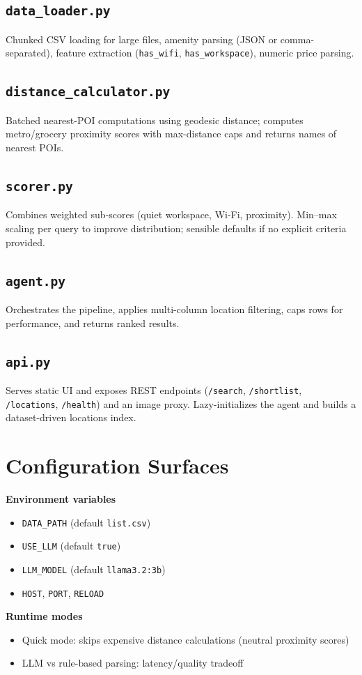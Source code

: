 \documentclass[11pt]{article}
\begin{document}
\subsection{\texttt{data\_loader.py}}
Chunked CSV loading for large files, amenity parsing (JSON or comma-separated), feature extraction (\texttt{has\_wifi}, \texttt{has\_workspace}), numeric price parsing.

\subsection{\texttt{distance\_calculator.py}}
Batched nearest-POI computations using geodesic distance; computes metro/grocery proximity scores with max-distance caps and returns names of nearest POIs.

\subsection{\texttt{scorer.py}}
Combines weighted sub-scores (quiet workspace, Wi-Fi, proximity). Min--max scaling per query to improve distribution; sensible defaults if no explicit criteria provided.

\subsection{\texttt{agent.py}}
Orchestrates the pipeline, applies multi-column location filtering, caps rows for performance, and returns ranked results.

\subsection{\texttt{api.py}}
Serves static UI and exposes REST endpoints (\texttt{/search}, \texttt{/shortlist}, \texttt{/locations}, \texttt{/health}) and an image proxy. Lazy-initializes the agent and builds a dataset-driven locations index.

\section{Configuration Surfaces}
\textbf{Environment variables}
\begin{itemize}
  \item \texttt{DATA\_PATH} (default \texttt{list.csv})
  \item \texttt{USE\_LLM} (default \texttt{true})
  \item \texttt{LLM\_MODEL} (default \texttt{llama3.2:3b})
  \item \texttt{HOST}, \texttt{PORT}, \texttt{RELOAD}
\end{itemize}
\textbf{Runtime modes}
\begin{itemize}
  \item Quick mode: skips expensive distance calculations (neutral proximity scores)
  \item LLM vs rule-based parsing: latency/quality tradeoff
\end{itemize}
\end{document}

